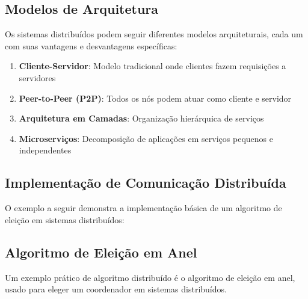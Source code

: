 \subsection{Modelos de Arquitetura}

Os sistemas distribuídos podem seguir diferentes modelos arquiteturais, cada um com suas vantagens e desvantagens específicas:

\begin{enumerate}
    \item \textbf{Cliente-Servidor}: Modelo tradicional onde clientes fazem requisições a servidores
    \item \textbf{Peer-to-Peer (P2P)}: Todos os nós podem atuar como cliente e servidor
    \item \textbf{Arquitetura em Camadas}: Organização hierárquica de serviços
    \item \textbf{Microserviços}: Decomposição de aplicações em serviços pequenos e independentes
\end{enumerate}

\subsection{Implementação de Comunicação Distribuída}

O exemplo a seguir demonstra a implementação básica de um algoritmo de eleição em sistemas distribuídos:

\subsection{Algoritmo de Eleição em Anel}

Um exemplo prático de algoritmo distribuído é o algoritmo de eleição em anel, usado para eleger um coordenador em sistemas distribuídos.

